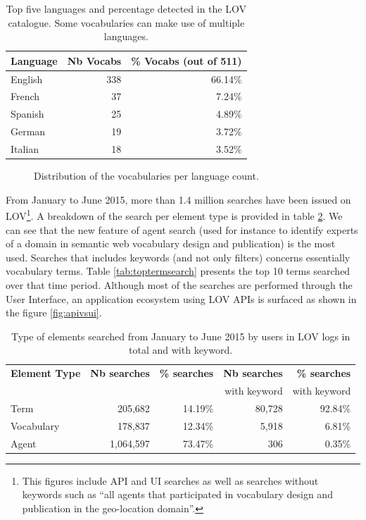 \documentclass{iosart2c}
\begin{document}
 \begin{table}[h!tb]
\caption{Top five languages and percentage detected in the LOV catalogue. Some vocabularies can make use of multiple languages.}
\begin{tabular}{lrr}
\hline
\textbf{Language} & \textbf{Nb Vocabs} & \textbf{\% Vocabs (out of 511)}  \\ \hline
English & 338 & 66.14\%      \\
French & 37 & 7.24\%      \\
Spanish & 25 & 4.89\%      \\
German & 19 & 3.72\%      \\
Italian & 18 & 3.52\%      \\
\hline  
\end{tabular}
\label{tab:language}
\end{table}

\begin{figure}[htb]

\caption{\label{fig:langdist} Distribution of the vocabularies per language count.}
\end{figure}

From January to June 2015, more than 1.4 million searches have been issued on LOV\footnote{This figures include API and UI searches as well as searches without keywords such as ``all agents that participated in vocabulary design and publication in the geo-location domain''.}. A breakdown of the search per element type is provided in table \ref{tab:searchcategory}. We can see that the new feature of agent search (used for instance to identify experts of a domain in semantic web vocabulary design and publication) is the most used. Searches that includes keywords (and not only filters) concerns essentially vocabulary terms. Table \ref{tab:toptermsearch} presents the top 10 terms searched over that time period. Although most of the searches are performed through the User Interface, an application ecosystem using LOV APIs is surfaced as shown in the figure \ref{fig:apivsui}. 

\begin{table}[h!tb]
\caption{Type of elements searched from January to June 2015 by users in LOV logs in total and with keyword.}
\begin{tabular}{l|rr|rr}
\hline
\textbf{Element Type } & \textbf{Nb searches} & \textbf{\% searches} & \textbf{Nb searches} & \textbf{\% searches} \\
 &  & & with keyword & with keyword \\ \hline
Term & 205,682 & 14.19\% & 80,728 & 92.84\% \\
Vocabulary & 178,837 & 12.34\% & 5,918 & 6.81\% \\
Agent & 1,064,597 & 73.47\% & 306 & 0.35\% \\
\hline  
\end{tabular}
\label{tab:searchcategory}
\end{table}
\end{document}
